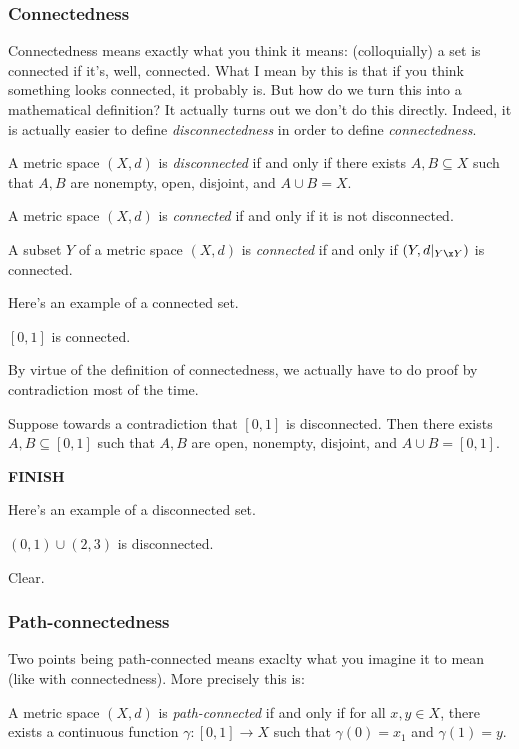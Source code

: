 \documentclass[class=article, crop=false]{standalone}
\begin{document}
\subsubsection*{Connectedness}

Connectedness means exactly what you think it means: (colloquially) a set is connected if it's, well, connected. What I mean by this is that if you think something looks connected, it probably is. But how do we turn this into a mathematical definition? It actually turns out we don't do this directly. Indeed, it is actually easier to define \textit{disconnectedness} in order to define \textit{connectedness}.

\begin{defn}
    A metric space $(X,d)$ is \textit{disconnected} if and only if there exists $A,B \subseteq X$ such that $A,B$ are nonempty, open, disjoint, and $A \cup B = X$.

    A metric space $(X,d)$ is \textit{connected} if and only if it is not disconnected.

    A subset $Y$ of a metric space $(X,d)$ is \textit{connected} if and only if $(Y,d|_{Y \x Y})$ is connected.
\end{defn}


Here's an example of a connected set.
\begin{ex}
    $[0,1]$ is connected.
\end{ex}
By virtue of the definition of connectedness, we actually have to do proof by contradiction most of the time.
\begin{pf}
    Suppose towards a contradiction that $[0,1]$ is disconnected. Then there exists $A,B \subseteq [0,1]$ such that $A,B$ are open, nonempty, disjoint, and $A \cup B = [0,1]$.

    \textbf{FINISH}
\end{pf}

Here's an example of a disconnected set.
\begin{ex}
    $(0,1) \cup (2,3)$ is disconnected.
\end{ex}
\begin{pf}
    Clear.
\end{pf}


\subsubsection*{Path-connectedness}

Two points being path-connected means exaclty what you imagine it to mean (like with connectedness). More precisely this is:
\begin{defn}
    A metric space $(X,d)$ is \textit{path-connected} if and only if for all $x,y \in X$, there exists a continuous function $\gamma \colon [0,1] \to X$ such that $\gamma(0) = x_1$ and $\gamma(1)=y$.
\end{defn}
\end{document}

